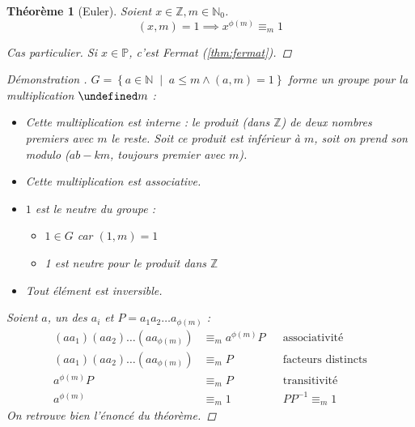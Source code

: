 \documentclass[11pt,twocolumn]{article}
\let\mod\undefined
\DeclareMathOperator{\mod}{mod}
\theoremstyle{plain}
\newtheorem{thm}{Théorème}
\newcommand{\esP}{\mathbb{P}} %
\newcommand{\esN}{\mathbb{N}} %
\newcommand{\esZ}{\mathbb{Z}} %
\newenvironment{cproof}[1]{\begin{proof}[Démonstration \cite{#1}]}{\end{proof}}
\begin{document}
\begin{thm}[Euler]\label{thm:euler}
	Soient $x \in \esZ, m \in \esN_0$. \[
		(x,m) = 1 \implies x^{\phi(m)} \equiv_m 1
	\]
	\begin{proof}[Cas particulier]
		Si $x \in \esP$, c'est Fermat (\ref{thm:fermat}).
	\end{proof}
	\begin{cproof}{Buys}
		$G=\left\{a\in\esN \; \middle| \; a \leq m \land (a,m)=1\right\}$
		forme un groupe pour la multiplication $\mod m$ :
		\begin{itemize}
			\item Cette multiplication est interne : le produit (dans $\esZ$)
				de deux nombres premiers avec $m$ le reste.
				Soit ce produit est inférieur à $m$,
				soit on prend son modulo ($ab-km$, toujours premier avec $m$).
			\item Cette multiplication est associative.
			\item $1$ est le neutre du groupe :
				\begin{itemize}
					\item $1\in G$ car $(1,m)=1$
					\item 1 est neutre pour le produit dans $\esZ$
				\end{itemize}
			\item Tout élément est inversible.
		\end{itemize}
		Soient $a$, un des $a_i$ et $P=a_1a_2\dots a_{\phi(m)}$ :
		\begin{align*}
			\left(aa_1\right)\left(aa_2\right)\dots\left(aa_{\phi(m)}\right)
			&\equiv_m a^{\phi(m)}P && \text{associativité} \\
			\left(aa_1\right)\left(aa_2\right)\dots\left(aa_{\phi(m)}\right)
			&\equiv_m P && \text{facteurs distincts} \\
			a^{\phi(m)}P &\equiv_m P && \text{transitivité} \\
			a^{\phi(m)} &\equiv_m 1 && PP^{-1}\equiv_m1
		\end{align*}
		On retrouve bien l'énoncé du théorème.
	\end{cproof}
\end{thm}
\end{document}
